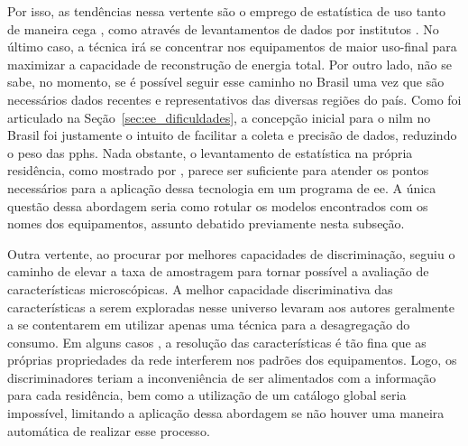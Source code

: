 Por isso, as tendências nessa vertente são o emprego de estatística de
uso tanto de maneira cega \cite{nilm_zeifman_vast_2011,
nilm_zeifman_vastext_approach_2012,
nilm_zeifman_statistical_vastext_1stws_2012}, como através de
levantamentos de dados por institutos
\cite{nilm_zeifman_statistical_naive_enduses_2013}. No último caso, a
técnica irá se concentrar nos equipamentos de maior uso-final para
maximizar a capacidade de reconstrução de energia total. Por outro
lado, não se sabe, no momento, se é possível seguir esse caminho no
Brasil uma vez que são necessários dados recentes e representativos
das diversas regiões do país. Como foi articulado na
Seção~\ref{sec:ee_dificuldades}, a concepção inicial para o
\gls{nilm} no Brasil foi justamente o intuito de facilitar a coleta e
precisão de dados, reduzindo o peso das \glspl{pph}. Nada obstante, o
levantamento de estatística na própria residência, como mostrado por
\cite{nilm_zeifman_vastext_approach_2012,nilm_zeifman_statistical_vastext_1stws_2012},
parece ser suficiente para atender os pontos necessários para a
aplicação dessa tecnologia em um programa de \gls{ee}. A única questão
dessa abordagem seria como rotular os modelos encontrados com os
nomes dos equipamentos, assunto debatido previamente nesta subseção.

Outra vertente, ao procurar por melhores capacidades de discriminação,
seguiu o caminho de elevar a taxa de amostragem \cite{
nilm_zeifman_vast_hisample_pdfmerge_2011,nilm_liang_pt1_2010_34,
nilm_liang_pt2_2010_40,nilm_patel_2007_29,nilm_gupta_patel_2010_30,
nilm_lee_variable_speed_estimation_2005_24,
nilm_wichakool_2009_25,nilm_shaw_2008_26,nilm_berges_2008_7,nilm_berges_2009_36,
2010_nilm_melhorando_pph_usa_37,nilm_chan_2000_31,nilm_coppe_nascimento,
nilm_lee_2004_32,nilm_lam_2007_33, nilm_srinivasan_nn_2006_27,
nilm_itajuba_rodrigues,nilm_suzuki_2011_35} para tornar possível a
avaliação de características microscópicas. A melhor capacidade
discriminativa das características a serem exploradas nesse universo
levaram aos autores geralmente a se contentarem em utilizar apenas uma
técnica para a desagregação do consumo. Em alguns casos \cite{
nilm_patel_2007_29,nilm_gupta_patel_2010_30}, a
resolução das características é tão fina que as próprias propriedades
da rede interferem nos padrões dos equipamentos. Logo, os discriminadores 
teriam a inconveniência de ser alimentados com a informação para
cada residência, bem como a utilização de um catálogo global seria
impossível, limitando a aplicação dessa abordagem se não houver
uma maneira automática de realizar esse processo. 

